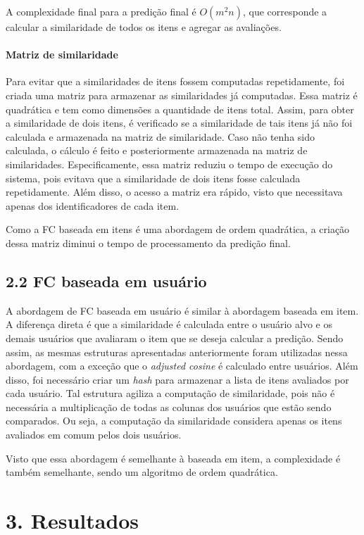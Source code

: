 \documentclass[brazil,a4paper,11pt]{article}
\begin{document}
A complexidade final para a predição final é $O(m^2n)$, que corresponde a calcular a similaridade de todos os itens e agregar as avaliações.


\paragraph{Matriz de similaridade} Para evitar que a similaridades de itens fossem computadas repetidamente, foi criada uma matriz para armazenar as similaridades já computadas. Essa matriz é quadrática e tem como dimensões a quantidade de itens total. Assim, para obter a similaridade de dois itens, é verificado se a similaridade de tais itens já não foi calculada e armazenada na matriz de similaridade. Caso não tenha sido calculada, o cálculo é feito e posteriormente armazenada na matriz de similaridades. Especificamente, essa matriz reduziu o tempo de execução do sistema, pois evitava que a similaridade de dois itens fosse calculada repetidamente. Além disso, o acesso a matriz era rápido, visto que necessitava apenas dos identificadores de cada item. 

Como a FC baseada em itens é uma abordagem de ordem quadrática, a criação dessa matriz diminui o tempo de processamento da predição final.


\subsection{2.2 FC baseada em usuário}

A abordagem de FC baseada em usuário é similar à abordagem baseada em item. A diferença direta é que a similaridade é calculada entre o usuário alvo e os demais usuários que avaliaram o item que se deseja calcular a predição. Sendo assim, as mesmas estruturas apresentadas anteriormente foram utilizadas nessa abordagem, com a exceção que o \textit{adjusted cosine} é calculado entre usuários. Além disso, foi necessário criar um \textit{hash} para armazenar a lista de itens avaliados por cada usuário. Tal estrutura agiliza a computação de similaridade, pois não é necessária a multiplicação de todas as colunas dos usuários que estão sendo comparados. Ou seja, a computação da similaridade considera apenas os itens avaliados em comum pelos dois usuários. 

Visto que essa abordagem é semelhante à baseada em item, a complexidade é também semelhante, sendo um algoritmo de ordem quadrática.

\section{3. Resultados}
\end{document}
